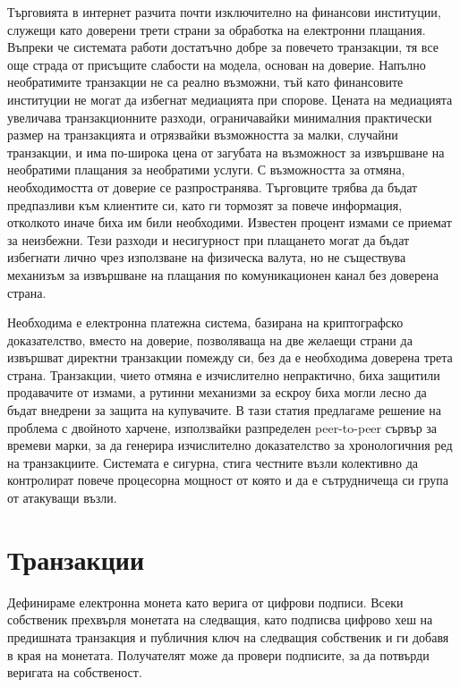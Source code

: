 \documentclass[11pt,a4paper]{article}
\begin{document}
Търговията в интернет разчита почти изключително на финансови институции, служещи като доверени трети страни за обработка на електронни плащания. Въпреки че системата работи достатъчно добре за повечето транзакции, тя все още страда от присъщите слабости на модела, основан на доверие. Напълно необратимите транзакции не са реално възможни, тъй като финансовите институции не могат да избегнат медиацията при спорове. Цената на медиацията увеличава транзакционните разходи, ограничавайки минималния практически размер на транзакцията и отрязвайки възможността за малки, случайни транзакции, и има по-широка цена от загубата на възможност за извършване на необратими плащания за необратими услуги. С възможността за отмяна, необходимостта от доверие се разпространява. Търговците трябва да бъдат предпазливи към клиентите си, като ги тормозят за повече информация, отколкото иначе биха им били необходими. Известен процент измами се приемат за неизбежни. Тези разходи и несигурност при плащането могат да бъдат избегнати лично чрез използване на физическа валута, но не съществува механизъм за извършване на плащания по комуникационен канал без доверена страна.

Необходима е електронна платежна система, базирана на криптографско доказателство, вместо на доверие, позволяваща на две желаещи страни да извършват директни транзакции помежду си, без да е необходима доверена трета страна. Транзакции, чието отмяна е изчислително непрактично, биха защитили продавачите от измами, а рутинни механизми за ескроу биха могли лесно да бъдат внедрени за защита на купувачите. В тази статия предлагаме решение на проблема с двойното харчене, използвайки разпределен peer-to-peer сървър за времеви марки, за да генерира изчислително доказателство за хронологичния ред на транзакциите. Системата е сигурна, стига честните възли колективно да контролират повече процесорна мощност от която и да е сътрудничеща си група от атакуващи възли.

\section{Транзакции}

Дефинираме електронна монета като верига от цифрови подписи. Всеки собственик прехвърля монетата на следващия, като подписва цифрово хеш на предишната транзакция и публичния ключ на следващия собственик и ги добавя в края на монетата. Получателят може да провери подписите, за да потвърди веригата на собственост.
\end{document}
